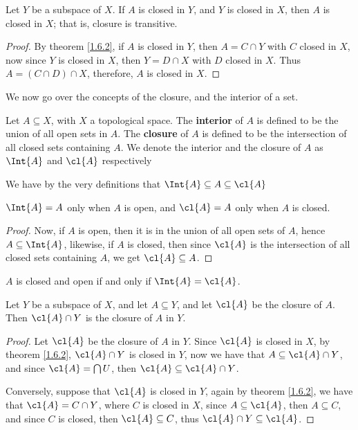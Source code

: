\begin{theorem}\label{1.6.3}
    Let $Y$ be a subspace of  $X$. If  $A$ is closed in  $Y$, and  $Y$ is closed
    in  $X$, then  $A$ is closed in  $X$; that is, closure is transitive.
\end{theorem}
\begin{proof}
    By theorem \ref{1.6.2}, if $A$ is closed in  $Y$, then  $A=C \cap Y$ with
    $C$ closed in  $X$, now since  $Y$ is closed in  $X$, then  $Y=D \cap X$
    with  $D$ closed in  $X$. Thus  $A=(C \cap D) \cap X$, therefore,  $A$ is
    closed in  $X$.
\end{proof}

We now go over the concepts of the closure, and the interior of a set.

\begin{definition}
    Let $A \subseteq X$, with  $X$ a topological space. The  \textbf{interior}
    of $A$ is defined to be the union of all open sets in  $A$. The
    \textbf{closure} of $A$ is defined to be the intersection of all closed sets
    containing $A$. We denote the interior and the closure of  $A$ as  $\Int{A}$
    and  $\cl{A}$ respectively
\end{definition}

We have by the very definitions that $\Int{A} \subseteq A \subseteq \cl{A}$

\begin{lemma}\label{1.6.4}
    $\Int{A}=A$ only when  $A$ is open, and  $\cl{A}=A$ only when  $A$ is
    closed.
\end{lemma}
\begin{proof}
    Now, if $A$ is open, then it is in the union of all open sets of  $A$, hence
    $A \subseteq \Int{A}$, likewise, if  $A$ is closed, then since $\cl{A}$ is
    the intersection of all closed sets containing  $A$, we get $\cl{A}
    \subseteq A$.
\end{proof}
\begin{corollary}
    $A$ is closed and open if and only if  $\Int{A}=\cl{A}$.
\end{corollary}

\begin{theorem}\label{1.6.5}
    Let $Y$ be a subspace of  $X$, and let  $A \subseteq Y$, and let $\cl{A}$
    be the closure of $A$. Then  $\cl{A} \cap Y$ is the closure of  $A$ in
    $Y$.
\end{theorem}
\begin{proof}
    Let $\cl{A}$ be the closure of  $A$ in  $Y$. Since  $\cl{A}$ is closed in
    $X$, by theorem \ref{1.6.2},  $\cl{A} \cap Y$ is closed in  $Y$, now we
    have that $A \subseteq \cl{A} \cap Y$, and since $\cl{A}=\bigcap{U}$, then
    $\cl{A} \subseteq \cl{A} \cap Y$.

    Conversely, suppose that $\cl{A}$ is closed in  $Y$, again by theorem
    \ref{1.6.2}, we have that  $\cl{A}=C \cap Y$, where  $C$ is closed in  $X$,
    since  $A \subseteq \cl{A}$, then  $A \subseteq C$, and since  $C$ is
    closed, then  $\cl{A} \subseteq C$, thus  $\cl{A} \cap Y \subseteq
    \cl{A}$.
\end{proof}

